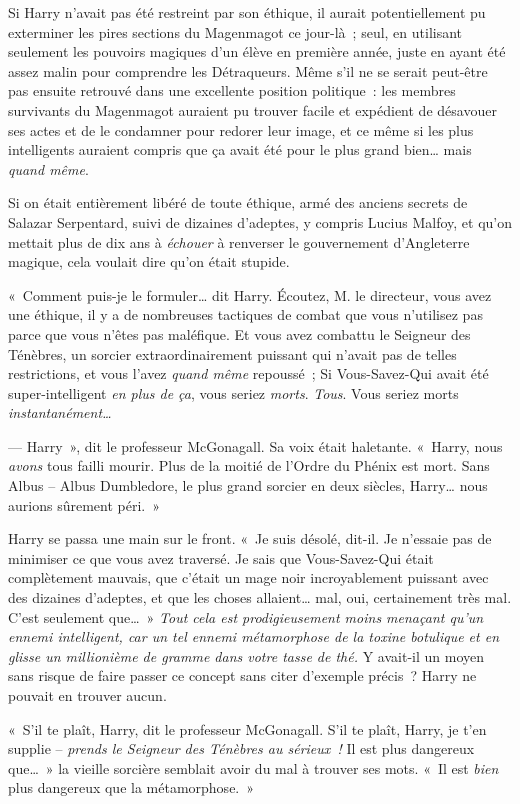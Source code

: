 Si Harry n'avait pas été restreint par son éthique, il aurait potentiellement pu exterminer les pires sections du Magenmagot ce jour-là~; seul, en utilisant seulement les pouvoirs magiques d'un élève en première année, juste en ayant été assez malin pour comprendre les Détraqueurs. Même s'il ne se serait peut-être pas ensuite retrouvé dans une excellente position politique~: les membres survivants du Magenmagot auraient pu trouver facile et expédient de désavouer ses actes et de le condamner pour redorer leur image, et ce même si les plus intelligents auraient compris que ça avait été pour le plus grand bien… mais \emph{quand même}.

Si on était entièrement libéré de toute éthique, armé des anciens secrets de Salazar Serpentard, suivi de dizaines d'adeptes, y compris Lucius Malfoy, et qu'on mettait plus de dix ans à \emph{échouer} à renverser le gouvernement d'Angleterre magique, cela voulait dire qu'on était stupide.

«~Comment puis-je le formuler… dit Harry. Écoutez, M. le directeur, vous avez une éthique, il y a de nombreuses tactiques de combat que vous n'utilisez pas parce que vous n'êtes pas maléfique. Et vous avez combattu le Seigneur des Ténèbres, un sorcier extraordinairement puissant qui n'avait pas de telles restrictions, et vous l'avez \emph{quand même} repoussé~; Si Vous-Savez-Qui avait été super-intelligent \emph{en plus de ça}, vous seriez \emph{morts}. \emph{Tous}. Vous seriez morts \emph{instantanément…}

--- Harry~», dit le professeur McGonagall. Sa voix était haletante. «~Harry, nous \emph{avons} tous failli mourir. Plus de la moitié de l'Ordre du Phénix est mort. Sans Albus -- Albus Dumbledore, le plus grand sorcier en deux siècles, Harry… nous aurions sûrement péri.~»

Harry se passa une main sur le front. «~Je suis désolé, dit-il. Je n'essaie pas de minimiser ce que vous avez traversé. Je sais que Vous-Savez-Qui était complètement mauvais, que c'était un mage noir incroyablement puissant avec des dizaines d'adeptes, et que les choses allaient… mal, oui, certainement très mal. C'est seulement que…~» \emph{Tout cela est prodigieusement moins menaçant qu'un ennemi intelligent, car un tel ennemi métamorphose de la toxine botulique et en glisse un millionième de gramme dans votre tasse de thé.} Y avait-il un moyen sans risque de faire passer ce concept sans citer d'exemple précis~? Harry ne pouvait en trouver aucun.

«~S'il te plaît, Harry, dit le professeur McGonagall. S'il te plaît, Harry, je t'en supplie -- \emph{prends le Seigneur des Ténèbres au sérieux~!} Il est plus dangereux que…~» la vieille sorcière semblait avoir du mal à trouver ses mots. «~Il est \emph{bien} plus dangereux que la métamorphose.~»

